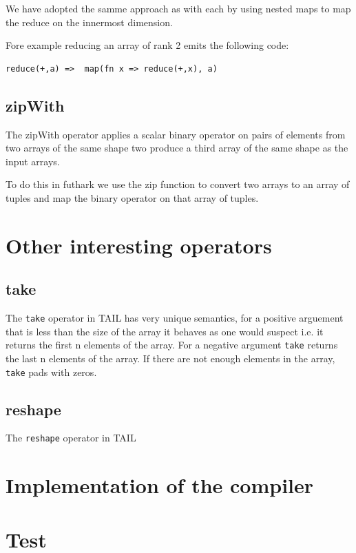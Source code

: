 \documentclass[11pt]{article}
\begin{document}
We have adopted the samme approach as with each by using nested maps to map the reduce on the innermost dimension.

Fore example reducing an array of rank 2 emits the following code:

\begin{lstlisting}[numbers=none,frame=none]
reduce(+,a)	=> 	map(fn x => reduce(+,x), a)
\end{lstlisting}

\subsection{zipWith}

The zipWith operator applies a scalar binary operator on pairs of elements from two arrays of the same shape two
produce a third array of the same shape as the input arrays.

 To do this in futhark we use the zip function to convert two arrays to an array of tuples and map the binary operator on that array of tuples.

\section{Other interesting operators}

\subsection{take}

The {\tt take} operator in TAIL has very unique semantics, for a positive arguement that is less than the size of the array it behaves as one would suspect i.e. it returns the first n elements of the array. For a negative argument {\tt take} returns the last n elements of the array. If there are not enough elements in the array, {\tt take} pads with zeros. 

\subsection{reshape}

The {\tt reshape} operator in TAIL 

\section{Implementation of the compiler}

\section{Test}
\end{document}
